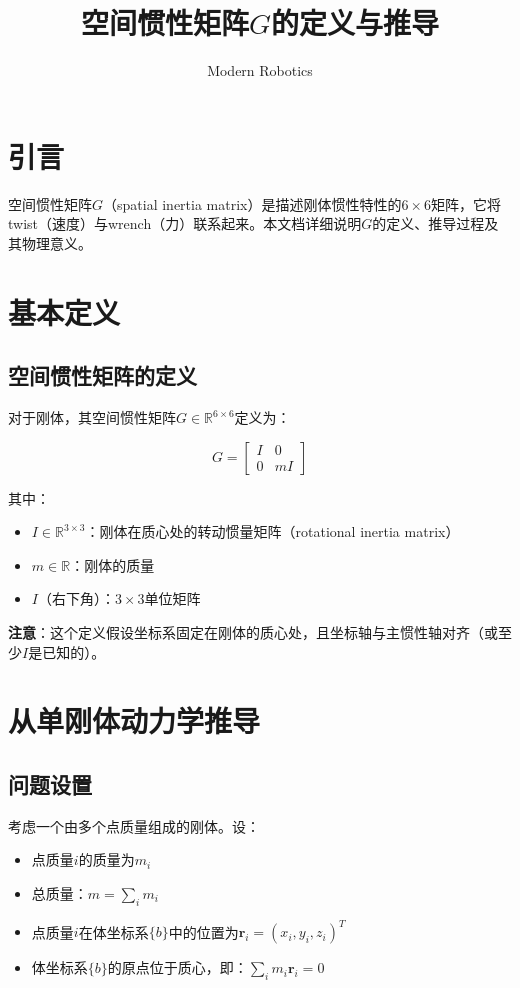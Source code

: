 \documentclass[12pt,a4paper]{article}
\title{空间惯性矩阵$G$的定义与推导}
\author{Modern Robotics}
\date{}
\begin{document}
\maketitle

\section{引言}

空间惯性矩阵$G$（spatial inertia matrix）是描述刚体惯性特性的$6 \times 6$矩阵，它将twist（速度）与wrench（力）联系起来。本文档详细说明$G$的定义、推导过程及其物理意义。

\section{基本定义}

\subsection{空间惯性矩阵的定义}

对于刚体，其空间惯性矩阵$G \in \mathbb{R}^{6 \times 6}$定义为：

\begin{equation}
G = \begin{bmatrix}
I & 0 \\
0 & mI
\end{bmatrix}
\label{eq:G_definition}
\end{equation}

其中：
\begin{itemize}
\item $I \in \mathbb{R}^{3 \times 3}$：刚体在质心处的转动惯量矩阵（rotational inertia matrix）
\item $m \in \mathbb{R}$：刚体的质量
\item $I$（右下角）：$3 \times 3$单位矩阵
\end{itemize}

\textbf{注意}：这个定义假设坐标系固定在刚体的质心处，且坐标轴与主惯性轴对齐（或至少$I$是已知的）。

\section{从单刚体动力学推导}

\subsection{问题设置}

考虑一个由多个点质量组成的刚体。设：
\begin{itemize}
\item 点质量$i$的质量为$m_i$
\item 总质量：$m = \sum_i m_i$
\item 点质量$i$在体坐标系$\{b\}$中的位置为$\bm{r}_i = (x_i, y_i, z_i)^T$
\item 体坐标系$\{b\}$的原点位于质心，即：$\sum_i m_i \bm{r}_i = 0$
\end{itemize}
\end{document}

